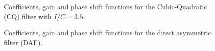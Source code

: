 \documentclass[
]{article}
\newcommand\1{\mathds{1}}
\begin{document}
\begin{figure}[H]

\caption{\label{fig-graphs-coef-cq}Coefficients, gain and phase shift
functions for the Cubic-Quadratic (CQ) filter with \(I/C=3.5\).}


\end{figure}%

\begin{figure}[H]

\caption{\label{fig-graphs-coef-daf}Coefficients, gain and phase shift
functions for the direct asymmetric filter (DAF).}


\end{figure}%
\end{document}
